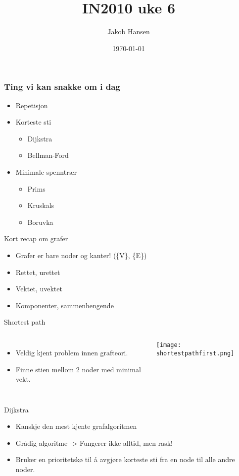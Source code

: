 \documentclass[norsk]{beamer}
\title{IN2010 uke 6}
\author{Jakob Hansen}
\date{\today}
\begin{document}
	\frame{\titlepage}
	\begin{frame}
       \frametitle{Ting vi kan snakke om i dag}
       \begin{itemize}
           \item Repetisjon
		   \item Korteste sti
			   \begin{itemize}
				   \item Dijkstra
				   \item Bellman-Ford
				\end{itemize}
		   \item Minimale spenntrær
			   \begin{itemize}
				   \item Prims
				   \item Kruskals
				   \item Boruvka
				\end{itemize}
       \end{itemize}
    \end{frame}

	\begin{frame}{Kort recap om grafer}
		\begin{itemize}
			\item Grafer er bare noder og kanter! (\{V\}, \{E\})
			\item Rettet, urettet
			\item Vektet, uvektet
			\item Komponenter, sammenhengende
		\end{itemize}
	\end{frame}


	\begin{frame}{Shortest path}
		\begin{columns}
		\begin{itemize}
			\item Veldig kjent problem innen grafteori.
			\item Finne stien mellom 2 noder med minimal vekt.
		\end{itemize}

			\texttt{[image: shortestpathfirst.png]}
		\end{columns}
	\end{frame}

	\begin{frame}{Dijkstra}
		\begin{itemize}
			\item Kanskje den mest kjente grafalgoritmen
			\item Grådig algoritme -> Fungerer ikke alltid, men rask!
			\item Bruker en prioritetskø til å avgjøre korteste sti fra en node til alle
				andre noder.
		\end{itemize}
	\end{frame}
\end{document}
